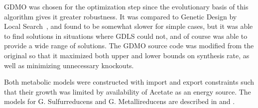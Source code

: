 \documentclass[a4paper,twocolumn]{article}
\begin{document}
GDMO was chosen for the optimization step since the evolutionary basis of this algorithm gives it greater robustness. It was compared to Genetic Design by Local Search~\cite{}, and found to be somewhat slower for simple cases, but it was able to find solutions in situations where GDLS could not, and of course was able to provide a wide range of solutions. The GDMO source code was modified from the original so that it maximized both upper and lower bounds on synthesis rate, as well as minimizing unnecessary knockouts.

Both metabolic models were constructed with import and export constraints such that their growth was limited by availability of Acetate as an energy source. The models for G. Sulfurreducens and G. Metallireducens are described in \cite{} and \cite{}.
\end{document}
